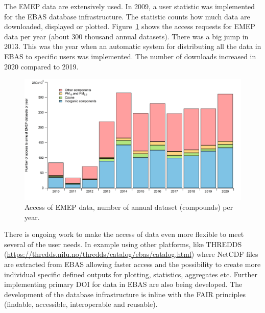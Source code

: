 The EMEP data are extensively used. In 2009, a user statistic was implemented for the EBAS database infrastructure.  
The statistic counts how much data are downloaded, displayed or plotted. Figure~\ref{fig:downloads} shows the access requests for EMEP data per year (about 300 thousand annual datasets). There was a big jump in 2013. This was the year when an automatic system for distributing all the data in EBAS to specific users was implemented. The number of downloads increased in 2020 compared to 2019. 

\begin{figure}[h]
\centering
\includegraphics[width=0.6\paperwidth]{FIGS_Obs/downloaded.png}
\caption{\label{fig:downloads}Access of EMEP data, number of annual dataset (compounds) per year.}
 \end{figure}

There is ongoing work to make the  access of data even more flexible to meet several of the user needs. In example using other platforms, like THREDDS (\url{https://thredds.nilu.no/thredds/catalog/ebas/catalog.html}) where NetCDF files are extracted from EBAS allowing faster access and the possibility to create more individual specific defined outputs for plotting, statistics, aggregates etc. Further implementing primary DOI for data in EBAS are also being developed. The development of the database infrastructure is inline with the FAIR principles (findable, accessible, interoperable and reusable).

\clearpage
\renewcommand\bibname{References}      %

